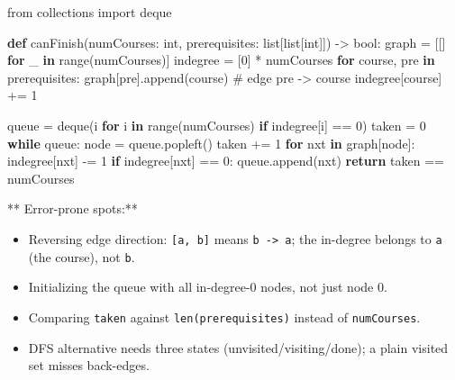 \documentclass[11pt]{article}
\providecommand{\tightlist}{\setlength{\itemsep}{1pt}\setlength{\parskip}{0pt}}
\newenvironment{Shaded}{\begin{snugshade}}{\end{snugshade}}
\newcommand{\BuiltInTok}[1]{\textcolor[rgb]{0.50,0.55,0.55}{#1}}
\newcommand{\CommentTok}[1]{\textcolor[rgb]{0.48,0.49,0.49}{#1}}
\newcommand{\ControlFlowTok}[1]{\textcolor[rgb]{0.99,0.74,0.29}{\textbf{#1}}}
\newcommand{\DecValTok}[1]{\textcolor[rgb]{0.96,0.45,0.00}{#1}}
\newcommand{\ImportTok}[1]{\textcolor[rgb]{0.15,0.68,0.38}{#1}}
\newcommand{\KeywordTok}[1]{\textcolor[rgb]{0.81,0.81,0.76}{\textbf{#1}}}
\newcommand{\NormalTok}[1]{\textcolor[rgb]{0.81,0.81,0.76}{#1}}
\newcommand{\OperatorTok}[1]{\textcolor[rgb]{0.81,0.81,0.76}{#1}}
\begin{document}

\begin{Shaded}
\begin{Highlighting}[]
\ImportTok{from}\NormalTok{ collections }\ImportTok{import}\NormalTok{ deque}

\KeywordTok{def}\NormalTok{ canFinish(numCourses: }\BuiltInTok{int}\NormalTok{, prerequisites: }\BuiltInTok{list}\NormalTok{[}\BuiltInTok{list}\NormalTok{[}\BuiltInTok{int}\NormalTok{]]) }\OperatorTok{{-}\textgreater{}} \BuiltInTok{bool}\NormalTok{:}
\NormalTok{    graph }\OperatorTok{=}\NormalTok{ [[] }\ControlFlowTok{for}\NormalTok{ \_ }\KeywordTok{in} \BuiltInTok{range}\NormalTok{(numCourses)]}
\NormalTok{    indegree }\OperatorTok{=}\NormalTok{ [}\DecValTok{0}\NormalTok{] }\OperatorTok{*}\NormalTok{ numCourses}
    \ControlFlowTok{for}\NormalTok{ course, pre }\KeywordTok{in}\NormalTok{ prerequisites:}
\NormalTok{        graph[pre].append(course)  }\CommentTok{\# edge pre {-}\textgreater{} course}
\NormalTok{        indegree[course] }\OperatorTok{+=} \DecValTok{1}

\NormalTok{    queue }\OperatorTok{=}\NormalTok{ deque(i }\ControlFlowTok{for}\NormalTok{ i }\KeywordTok{in} \BuiltInTok{range}\NormalTok{(numCourses) }\ControlFlowTok{if}\NormalTok{ indegree[i] }\OperatorTok{==} \DecValTok{0}\NormalTok{)}
\NormalTok{    taken }\OperatorTok{=} \DecValTok{0}
    \ControlFlowTok{while}\NormalTok{ queue:}
\NormalTok{        node }\OperatorTok{=}\NormalTok{ queue.popleft()}
\NormalTok{        taken }\OperatorTok{+=} \DecValTok{1}
        \ControlFlowTok{for}\NormalTok{ nxt }\KeywordTok{in}\NormalTok{ graph[node]:}
\NormalTok{            indegree[nxt] }\OperatorTok{{-}=} \DecValTok{1}
            \ControlFlowTok{if}\NormalTok{ indegree[nxt] }\OperatorTok{==} \DecValTok{0}\NormalTok{:}
\NormalTok{                queue.append(nxt)}
    \ControlFlowTok{return}\NormalTok{ taken }\OperatorTok{==}\NormalTok{ numCourses}
\end{Highlighting}
\end{Shaded}

** Error-prone spots:**

\begin{itemize}
\tightlist
\item
  Reversing edge direction: \texttt{{[}a,\ b{]}} means \texttt{b\ -\textgreater{}\ a}; the in-degree belongs to \texttt{a} (the course), not \texttt{b}.
\item
  Initializing the queue with all in-degree-0 nodes, not just node 0.
\item
  Comparing \texttt{taken} against \texttt{len(prerequisites)} instead of \texttt{numCourses}.
\item
  DFS alternative needs three states (unvisited/visiting/done); a plain visited set misses back-edges.
\end{itemize}
\end{document}
